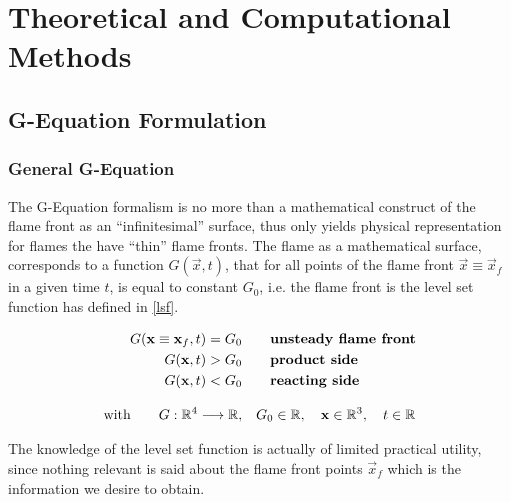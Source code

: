 \chapter{Theoretical and Computational Methods}


\section{G-Equation Formulation}
\subsection{General G-Equation}
The G-Equation formalism is no more than a mathematical construct of the flame front as an ``infinitesimal'' surface, thus only yields physical representation for flames the have ``thin'' flame fronts. The flame as a mathematical surface, corresponds to a function $G(\vec{x},t)$, that for all points of the flame front $\vec{x}\equiv\vec{x}_f$ in a given time $t$, is equal to constant $G_0$, i.e. the flame front is the level set function has defined in \eqref{lsf}. 
\begin{definition}
\begin{align}
G(\vec{x}\equiv\vec{x}_f,t)=G_0 &\qquad \text{\bf{unsteady flame front}} \label{lsf}\\
G(\vec{x},t)>G_0 &\qquad \text{\bf{product side}}\nonumber \\
G(\vec{x},t)<G_0 &\qquad \text{\bf{reacting side}}\nonumber \\[3mm]
\text{with} \qquad   G:\mathbb{R}^4 \longrightarrow \mathbb{R},& \quad G_0 \in \mathbb{R}, \quad \vec{x}\in \mathbb{R}^3, \quad t \in \mathbb{R} \nonumber
\end{align}
\end{definition}	
The knowledge of the level set function is actually of limited practical utility, since nothing relevant is said about the flame front points $\vec{x}_f$ which is the information we desire to obtain. 

